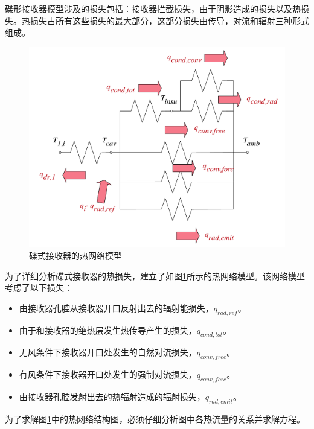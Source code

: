 碟形接收器模型涉及的损失包括：接收器拦截损失，由于阴影造成的损失以及热损失。热损失占所有这些损失的最大部分，这部分损失由传导，对流和辐射三种形式组成。
\noindent \begin{figure}[ht!]
\begin{center}
	\includegraphics[width = 0.5\columnwidth]{fig/thermalLosses.pdf}
	\caption{碟式接收器的热网络模型}
	\label{fig:thermal-lose}
\end{center}
\end{figure}
为了详细分析碟式接收器的热损失，建立了如图\ref{fig:thermal-lose}所示的热网络模型。该网络模型考虑了以下损失：
\begin{itemize}
	\item 由接收器孔腔从接收器开口反射出去的辐射能损失，$q_{rad,ref}$。
	\item 由于和接收器的绝热层发生热传导产生的损失，$q_{cond,tot}$。
	\item 无风条件下接收器开口处发生的自然对流损失，$q_{conv,free}$。
	\item 有风条件下接收器开口处发生的强制对流损失，$q_{conv,forc}$。
	\item 由接收器孔腔发射出去的热辐射造成的辐射损失，$q_{rad,emit}$。
\end{itemize}

为了求解图\ref{fig:thermal-lose}中的热网络结构图，必须仔细分析图中各热流量的关系并求解方程。


